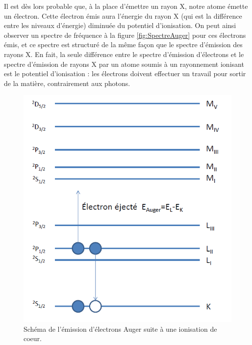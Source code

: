 Il est dès lors probable que, à la place d'émettre un rayon X, notre atome émette un électron. Cette électron émis aura l'énergie du rayon X (qui est la différence entre les niveaux d'énergie) diminuée du potentiel d'ionisation. On peut ainsi observer un spectre de fréquence à la figure \ref{fig:SpectreAuger} pour ces électrons émis, et ce spectre est structuré de la même façon que le spectre d'émission des rayons X. En fait, la seule différence entre le spectre d'émission d'électrons et le spectre d'émission de rayons X par un atome soumis à un rayonnement ionisant est le potentiel d'ionisation : les électrons doivent effectuer un travail pour sortir de la matière, contrairement aux photons.
\begin{figure}[tph]
    \centering
    \includegraphics[scale=0.8]{Images2/Auger.PNG}
    \caption{Schéma de l'émission d'électrons Auger suite à une ionisation de coeur.}
    \label{fig : Auger}
\end{figure}
